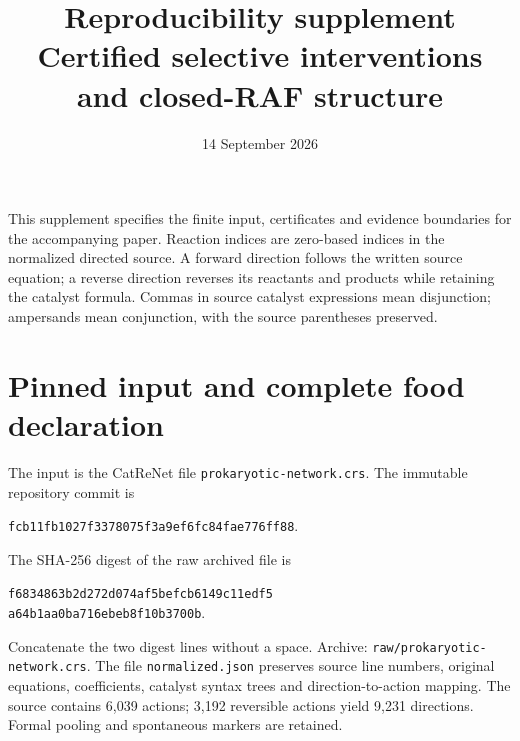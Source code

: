 \documentclass[10pt]{article}
\title{Reproducibility supplement\\Certified selective interventions and closed-RAF structure}
\author{}\date{14 September 2026}
\begin{document}
\maketitle
\noindent This supplement specifies the finite input, certificates and evidence boundaries for the accompanying paper. Reaction indices are zero-based indices in the normalized directed source. A forward direction follows the written source equation; a reverse direction reverses its reactants and products while retaining the catalyst formula. Commas in source catalyst expressions mean disjunction; ampersands mean conjunction, with the source parentheses preserved.
\section{Pinned input and complete food declaration}
The input is the CatReNet file \texttt{prokaryotic-network.crs}. The immutable repository commit is
\begin{center}\small\texttt{fcb11fb1027f3378075f3a9ef6fc84fae776ff88}.\end{center}
The SHA-256 digest of the raw archived file is
\begin{center}\small\texttt{f6834863b2d272d074af5befcb6149c11edf5}\\
\texttt{a64b1aa0ba716ebeb8f10b3700b}.\end{center}
Concatenate the two digest lines without a space. Archive: \texttt{raw/prokaryotic-network.crs}. The file \texttt{normalized.json} preserves source line numbers, original equations, coefficients, catalyst syntax trees and direction-to-action mapping. The source contains 6,039 actions; 3,192 reversible actions yield 9,231 directions. Formal pooling and spontaneous markers are retained.
\end{document}
